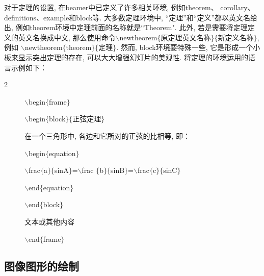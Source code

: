 对于定理的设置, 在beamer中已定义了许多相关环境, 例如theorem、 corollary、definitions、example和block等. 大多数定理环境中, “定理”和“定义”都以英文名给出, 例如theorem环境中定理前面的名称就是``Theorem". 此外, 若是需要将定理定义的英文名换成中文, 那么使用命令$\backslash$newtheorem$\{$原定理英文名称$\}\{$新定义名称$\}$, 例如
$\backslash$newtheorem$\{$theorem$\}\{$定理$\}$. 然而, block环境要特殊一些, 它是形成一个小板来显示突出定理的存在, 可以大大增强幻灯片的美观性. 将定理的环境运用的语言示例如下：\vspace*{-10pt}
 \begin{multicols}{2}
\begin{description}
  \item[]$\backslash$begin$\{$frame$\}$%
  \item[]$\backslash$begin$\{$block$\}\{$正弦定理$\}$%
  \item[] 在一个三角形中, 各边和它所对的正弦的比相等, 即：
  \item[]$\backslash$begin$\{$equation$\}$
 \item[]$\backslash$frac$\{$a$\}\{$sinA$\}$=$\backslash$frac
    $\{$b$\}\{$sinB$\}$=$\backslash$frac$\{$c$\}\{$sinC$\}$
 \item[]$\backslash$end$\{$equation$\}$
 \item[]$\backslash$end$\{$block$\}$
 \item[] 文本或其他内容
 \item[]$\backslash$end$\{$frame$\}$
\end{description}
 \end{multicols}

\subsection{图像图形的绘制}

